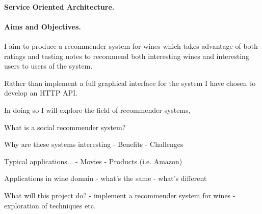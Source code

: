 \paragraph{Service Oriented Architecture.}

\paragraph{Aims and Objectives.}

I aim to produce a recommender system for wines which takes advantage of both ratings and tasting notes to recommend both interesting wines and interesting users to users of the system.

Rather than implement a full graphical interface for the system I have chosen to develop an HTTP API.

In doing so I will explore the field of recommender systems, 

What is a social recommender system?

Why are these systems interesting - Benefits - Challenges

Typical applications...  - Movies - Products (i.e. Amazon)

Applications in wine domain - what's the same - what's different

What will this project do?  - implement a recommender system for wines -
exploration of techniques etc.

